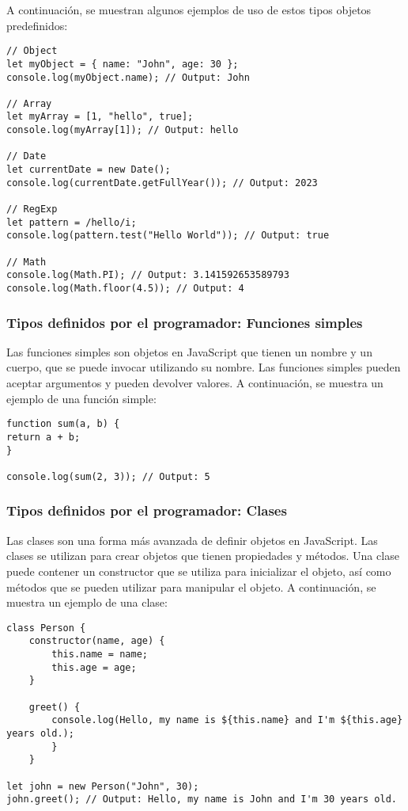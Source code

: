 \documentclass[executivepaper]{article}
\begin{document}
A continuación, se muestran algunos ejemplos de uso de estos tipos objetos predefinidos:

\begin{lstlisting}
// Object
let myObject = { name: "John", age: 30 };
console.log(myObject.name); // Output: John

// Array
let myArray = [1, "hello", true];
console.log(myArray[1]); // Output: hello

// Date
let currentDate = new Date();
console.log(currentDate.getFullYear()); // Output: 2023

// RegExp
let pattern = /hello/i;
console.log(pattern.test("Hello World")); // Output: true

// Math
console.log(Math.PI); // Output: 3.141592653589793
console.log(Math.floor(4.5)); // Output: 4
\end{lstlisting}

\subsubsection*{Tipos definidos por el programador: Funciones simples}

Las funciones simples son objetos en JavaScript que tienen un nombre y un cuerpo, que se puede invocar utilizando su nombre. Las funciones simples pueden aceptar argumentos y pueden devolver valores. A continuación, se muestra un ejemplo de una función simple:

\begin{lstlisting}
function sum(a, b) {
return a + b;
}

console.log(sum(2, 3)); // Output: 5
\end{lstlisting}

\subsubsection*{Tipos definidos por el programador: Clases}

Las clases son una forma más avanzada de definir objetos en JavaScript. Las clases se utilizan para crear objetos que tienen propiedades y métodos. Una clase puede contener un constructor que se utiliza para inicializar el objeto, así como métodos que se pueden utilizar para manipular el objeto. A continuación, se muestra un ejemplo de una clase:

\begin{lstlisting}
class Person {
    constructor(name, age) {
        this.name = name;
        this.age = age;
    }

    greet() {
        console.log(Hello, my name is ${this.name} and I'm ${this.age} years old.);
        }
    }

let john = new Person("John", 30);
john.greet(); // Output: Hello, my name is John and I'm 30 years old.
\end{lstlisting}
\end{document}
